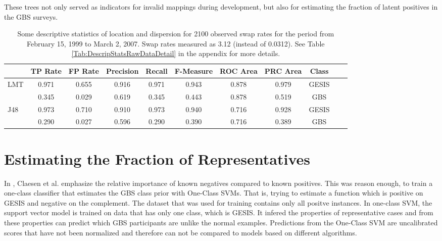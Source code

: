 These trees not only served as indicators for invalid mappings during development, but also for estimating the fraction of latent positives in the GBS surveys. 

\vspace{0.33cm}
\begin{table}[ht]
    \begin{center}
		\captionsetup{width= 430pt}
            {\footnotesize
            \begin{tabular}{l|cccccccccc}
                \hline \hline
                           &  TP Rate & FP Rate & Precision & Recall & F-Measure & ROC Area & PRC Area & Class \\
                \hline
                      LMT & 0.971 & 0.655 & 0.916 & 0.971 & 0.943 & 0.878 & 0.979 & GESIS\\
                      & 0.345 & 0.029 & 0.619 & 0.345 & 0.443 & 0.878 & 0.519 & GBS\\
                \hline \hline
     J48 & 0.973 & 0.710 & 0.910 & 0.973 & 0.940 & 0.716 & 0.928 & GESIS\\
                      & 0.290 & 0.027 & 0.596 & 0.290 & 0.390 & 0.716 & 0.389 & GBS\\
                		
\end{tabular}}
        \caption{Some descriptive statistics of location and dispersion for 2100 observed swap rates for the period from February 15, 1999 to March 2, 2007. Swap rates measured as 3.12 (instead of 0.0312). See Table \ref{Tab:DescripStatsRawDataDetail} in the appendix for more details.}
\label{Tab:DescripStatsRawData}
\end{center}
\end{table}

\section{Estimating the Fraction of Representatives}

In \cite{claesen2}, Claesen et al. emphasize the relative importance of known negatives compared to known positives. This was reason enough, to train a one-class classifier that estimates the GBS class prior with One-Class SVMs. That is, trying to estimate a function which is positive on GESIS and negative on the complement. The dataset that was used for training contains only all positve instances. In one-class SVM, the support vector model is trained on data that has only one class, which is GESIS. It infered the properties of representative cases and from these properties can predict which GBS participants are unlike the normal examples. Predictions from the One-Class SVM are uncalibrated scores that have not been normalized and therefore can not be compared to models based on different algorithms.

